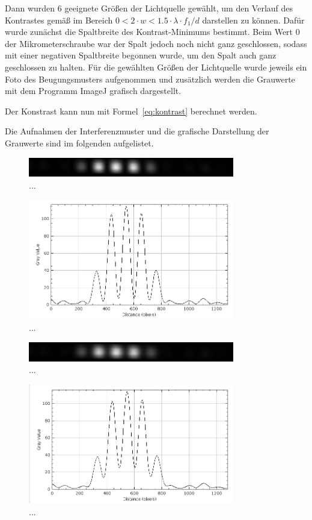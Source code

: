\documentclass{article}
\begin{document}
Dann wurden 6 geeignete Größen der Lichtquelle gewählt, um den Verlauf des Kontrastes gemäß im Bereich $0 < 2\cdot w < 1.5 \cdot \lambda\cdot f_1 / d$ darstellen zu können. Dafür wurde zunächst die Spaltbreite des Kontrast-Minimums bestimmt. Beim Wert 0 der Mikrometerschraube war der Spalt jedoch noch nicht ganz geschlossen, sodass mit einer negativen Spaltbreite begonnen wurde, um den Spalt auch ganz geschlossen zu halten.
Für die gewählten Größen der Lichtquelle wurde jeweils ein Foto des Beugungsmusters aufgenommen und zusätzlich werden die Grauwerte mit dem Programm ImageJ grafisch dargestellt.

Der Konstrast kann nun mit Formel~\ref{eq:kontrast} berechnet werden.

Die Aufnahmen der Interferenzmuster und die grafische Darstellung der Grauwerte sind im folgenden aufgelistet.

\begin{figure}[H]
\centering
\caption{...}
\includegraphics[width=9cm]{moodle/img2.png}
\end{figure}

\begin{figure}[H]
\centering
\caption{...}
\includegraphics[width=9cm]{moodle/img2_graph.png}
\end{figure}



\begin{figure}[H]
\centering
\caption{...}
\includegraphics[width=9cm]{moodle/img3.png}
\end{figure}

\begin{figure}[H]
\centering
\caption{...}
\includegraphics[width=9cm]{moodle/img3_graph.png}
\end{figure}
\end{document}
